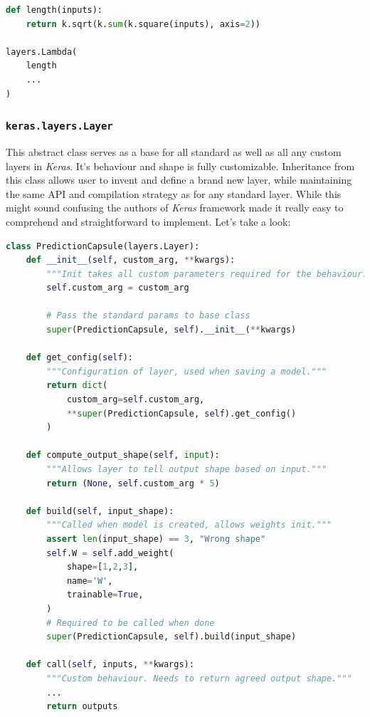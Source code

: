\begin{lstlisting}[language=Python, caption=Lambda layer]
def length(inputs):
    return k.sqrt(k.sum(k.square(inputs), axis=2))

layers.Lambda(
    length
    ...
)
\end{lstlisting}


\subsubsection{\texttt{keras.layers.Layer}}

This abstract class serves as a base for all standard as well as all any custom layers in \textit{Keras}. It's behaviour and shape is fully customizable. Inheritance from this class allows user to invent and define a brand new layer, while maintaining the same API and compilation strategy as for any standard layer. While this might sound confusing the authors of \textit{Keras} framework made it really easy to comprehend and straightforward to implement. Let's take a look:


\begin{lstlisting}[language=Python, caption=Custom layer example]
class PredictionCapsule(layers.Layer):
    def __init__(self, custom_arg, **kwargs):
        """Init takes all custom parameters required for the behaviour."""
        self.custom_arg = custom_arg

        # Pass the standard params to base class
        super(PredictionCapsule, self).__init__(**kwargs)

    def get_config(self):
        """Configuration of layer, used when saving a model."""
        return dict(
            custom_arg=self.custom_arg,
            **super(PredictionCapsule, self).get_config()
        )

    def compute_output_shape(self, input):
        """Allows layer to tell output shape based on input."""
        return (None, self.custom_arg * 5)

    def build(self, input_shape):
        """Called when model is created, allows weights init."""
        assert len(input_shape) == 3, "Wrong shape"
        self.W = self.add_weight(
            shape=[1,2,3],
            name='W',
            trainable=True,
        )
        # Required to be called when done
        super(PredictionCapsule, self).build(input_shape)

    def call(self, inputs, **kwargs):
        """Custom behaviour. Needs to return agreed output shape."""
        ...
        return outputs

\end{lstlisting}


